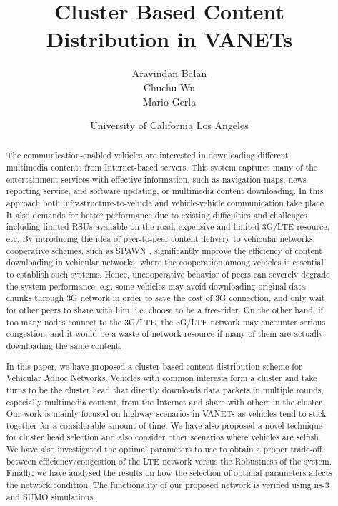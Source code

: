 \documentclass{acm_proc_article-sp}
\begin{document}
\title{Cluster Based Content Distribution in VANETs}


\author {
\alignauthor
Aravindan Balan\\
\alignauthor 
Chuchu Wu\\
\alignauthor 
Mario Gerla\\
       \and
\alignauthor 
University of California Los Angeles\\
}

\maketitle
\begin{abstract}
\vspace{1 mm}
The communication-enabled vehicles are interested in downloading different multimedia contents
from Internet-based servers. This system captures many of the entertainment services with
effective information, such as navigation maps, news reporting service, and software updating, or multimedia content downloading. In this approach both infrastructure-to-vehicle and vehicle-vehicle communication take place. It also demands for better performance due to existing difficulties and challenges including limited RSUs available on the road, expensive and limited 3G/LTE resource, etc. By introducing the idea of peer-to-peer content delivery to vehicular networks, cooperative schemes, such as SPAWN \cite{spawn}, significantly improve the efficiency of content downloading in vehicular networks, where the cooperation among vehicles is essential to establish such systems. Hence, uncooperative behavior of peers can severely degrade the system performance, e.g. some vehicles may avoid downloading original data chunks through 3G network in order to save the cost of 3G connection, and only wait for other peers to share with him, i.e. choose to be a free-rider. On the other hand, if too many nodes connect to the 3G/LTE, the 3G/LTE network may encounter serious congestion, and it would be a waste of network resource if many of them are actually downloading the same content.

In this paper, we have proposed a cluster based content distribution scheme for Vehicular Adhoc Networks. Vehicles with common interests form a cluster and take turns to be the cluster head that directly downloads data packets in multiple rounds, especially multimedia content, from the Internet and share with others in the cluster. Our work is mainly focused on highway scenarios in VANETs as vehicles tend to stick together for a considerable amount of time. We have also proposed a novel technique for cluster head selection and also consider other scenarios where vehicles are selfish. We have also investigated the optimal parameters to use to obtain a proper trade-off between efficiency/congestion of the LTE network versus the Robustness of the system. Finally, we have analysed the results on how the selection of optimal parameters affects the network condition. The functionality of our proposed network is verified using ns-3 and SUMO simulations. 


\end{abstract}
\end{document}
